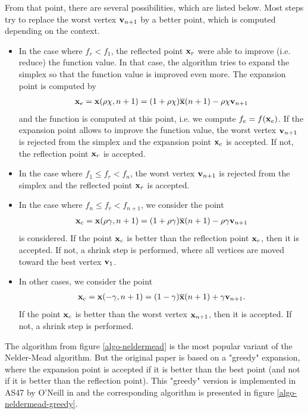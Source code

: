 From that point, there are several possibilities, which 
are listed below. Most steps try to replace the 
worst vertex $\mathbf{v}_{n+1}$ by a better point, which is computed 
depending on the context.
\begin{itemize}
\item In the case where $f_r<f_1$, the reflected point $\mathbf{x}_r$
were able to improve (i.e. reduce) the function value. In that case, the algorithm
tries to expand the simplex so that the function value is improved 
even more. The expansion point is computed by 
\begin{eqnarray}
\mathbf{x}_e = \mathbf{x}(\rho\chi,n+1) = (1+\rho\chi)\overline{\mathbf{x}}(n+1) - \rho\chi \mathbf{v}_{n+1}
\end{eqnarray}
and the function is computed at this point, i.e. we compute 
$f_e = f(\mathbf{x}_e)$.
If the expansion point allows to improve the function 
value, the worst vertex 
$\mathbf{v}_{n+1}$ is rejected from the simplex and the expansion point $\mathbf{x}_e$
is accepted. If not, the reflection point $\mathbf{x}_r$ is accepted.
\item In the case where $f_1\leq f_r<f_n$, the worst vertex 
$\mathbf{v}_{n+1}$ is rejected from the simplex and the reflected point $\mathbf{x}_r$
is accepted.
\item In the case where $f_n\leq f_r<f_{n+1}$, we consider the point 
\begin{eqnarray}
\mathbf{x}_c = \mathbf{x}(\rho\gamma,n+1) = (1+\rho\gamma)\overline{\mathbf{x}}(n+1) - \rho\gamma \mathbf{v}_{n+1}
\end{eqnarray}
is considered. If the point $\mathbf{x}_c$ is better than the reflection point $\mathbf{x}_r$,
then it is accepted. If not, a shrink step is performed, where 
all vertices are moved toward the best vertex $\mathbf{v}_1$.
\item In other cases, we consider the point 
\begin{eqnarray}
\mathbf{x}_c = \mathbf{x}(-\gamma,n+1) = (1-\gamma)\overline{\mathbf{x}}(n+1) + \gamma \mathbf{v}_{n+1}.
\end{eqnarray}
If the point $\mathbf{x}_c$ is better than the worst vertex $\mathbf{x}_{n+1}$,
then it is accepted. If not, a shrink step is performed.
\end{itemize}

The algorithm from figure \ref{algo-neldermead} is the most 
popular variant of the Nelder-Mead algorithm.
But the original paper is based on a "greedy" expansion, where 
the expansion point is accepted if it is better than the 
best point (and not if it is better than the reflection point).
This "greedy" version is implemented in AS47 by O'Neill in \cite{O'Neill1971AAF}
and the corresponding algorithm is presented in figure \ref{algo-neldermead-greedy}.

